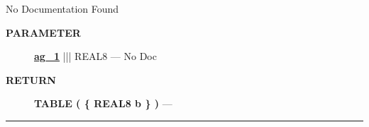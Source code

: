 \par





No Documentation Found






\par
\begin{description}
\item [\colorbox{tagtype}{\color{white} \textbf{\textsf{PARAMETER}}}] \textbf{\underline{ag\_1}} ||| REAL8 --- No Doc
\end{description}







\par
\begin{description}
\item [\colorbox{tagtype}{\color{white} \textbf{\textsf{RETURN}}}] \textbf{TABLE ( \{ REAL8 b \} )} --- 
\end{description}




\rule{\linewidth}{0.5pt}




